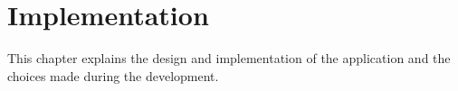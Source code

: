 \chapter{Implementation}
\label{chp:impl}

This chapter explains the design and implementation of the application and the choices made during the development.